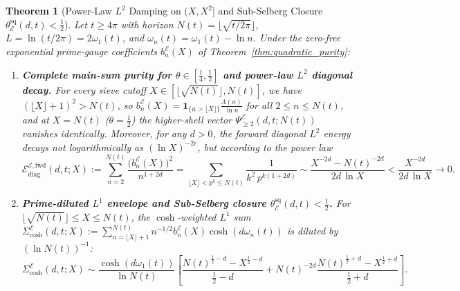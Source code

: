\documentclass[11pt,reqno]{amsart}
\newtheorem{theorem}{Theorem}[section]
\theoremstyle{definition}
\theoremstyle{remark}
\numberwithin{equation}{section}
\begin{document}
\begin{theorem}[{Power-Law $L^2$ Damping on $(X, X^2]$ and Sub-Selberg Closure $\theta_{\mathcal{E}}^{\mathrm{sq}}(d,t) < \frac{1}{2}$}]\label{thm:power_law_sub_selberg}
Let $t \ge 4\pi$ with horizon $N(t) = \lfloor\sqrt{t/2\pi}\rfloor$, $L = \ln(t/2\pi) = 2\omega_1(t)$, and $\omega_n(t) = \omega_1(t) - \ln n$. Under the zero-free exponential prime-gauge coefficients $b_n^{\mathcal{E}}(X)$ of Theorem~\ref{thm:quadratic_purity}:
\begin{enumerate}[label=\textup{(\alph*)},leftmargin=2.2em]
\item \textbf{Complete main-sum purity for $\theta \in [\frac{1}{4}, \frac{1}{2}]$ and power-law $L^2$ diagonal decay.} For every sieve cutoff $X \in [\lfloor\sqrt{N(t)}\rfloor, N(t)]$, we have $(\lfloor X\rfloor + 1)^2 > N(t)$, so $b_n^{\mathcal{E}}(X) = \mathbf{1}_{\{n > \lfloor X\rfloor\}}\frac{\Lambda(n)}{\ln n}$ for all $2 \le n \le N(t)$, and at $X = N(t)$ ($\theta = \frac{1}{2}$) the higher-shell vector $\Psi_{\ge 2}^{\mathcal{E}}(d,t;N(t))$ vanishes identically. Moreover, for any $d > 0$, the forward diagonal $L^2$ energy decays not logarithmically as $(\ln X)^{-2r}$, but according to the power law
\begin{equation}\label{eq:L2_power_law}
\mathcal{E}_{\mathrm{diag}}^{\mathcal{E},\mathrm{fwd}}(d,t;X) := \sum_{n=2}^{N(t)} \frac{\bigl(b_n^{\mathcal{E}}(X)\bigr)^2}{n^{1+2d}} = \sum_{\lfloor X\rfloor < p^k \le N(t)} \frac{1}{k^2\,p^{k(1+2d)}} \sim \frac{X^{-2d} - N(t)^{-2d}}{2d\,\ln X} < \frac{X^{-2d}}{2d\,\ln X} \longrightarrow 0.
\end{equation}
\item \textbf{Prime-diluted $L^1$ envelope and Sub-Selberg closure $\theta_{\mathcal{E}}^{\mathrm{sq}}(d,t) < \frac{1}{2}$.} For $\lfloor\sqrt{N(t)}\rfloor \le\allowbreak X \le N(t)$, the $\cosh$-weighted $L^1$ sum $\Sigma_{\cosh}^{\mathcal{E}}(d,t;X) :=\allowbreak \sum_{n=\lfloor X\rfloor+1}^{N(t)} n^{-1/2}b_n^{\mathcal{E}}(X)\allowbreak\cosh(d\omega_n(t))$ is diluted by $(\ln N(t))^{-1}$:
\begin{equation}\label{eq:L1_prime_dilution}
\Sigma_{\cosh}^{\mathcal{E}}(d,t;X) \sim \frac{\cosh(d\omega_1(t))}{\ln N(t)}\left[\frac{N(t)^{\frac{1}{2}-d} - X^{\frac{1}{2}-d}}{\frac{1}{2}-d} + N(t)^{-2d}\frac{N(t)^{\frac{1}{2}+d} - X^{\frac{1}{2}+d}}{\frac{1}{2}+d}\right].
\end{equation}

\end{enumerate}
\end{theorem}
\end{document}
